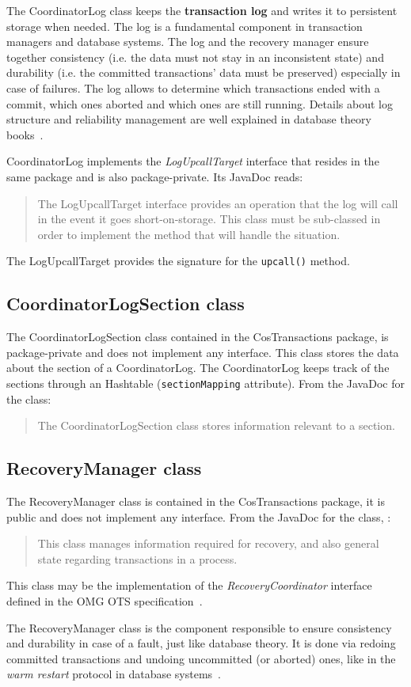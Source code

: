 The CoordinatorLog class keeps the \textbf{transaction log} and writes it to persistent storage when needed. The log is a fundamental component in transaction managers and database systems. The log and the recovery manager ensure together consistency (i.e. the data must not stay in an inconsistent state) and durability (i.e. the committed transactions' data must be preserved) especially in case of failures.
The log allows to determine which transactions ended with a commit, which ones aborted and which ones are still running.
Details about log structure and reliability management are well explained in database theory books~\cite{ceri-dbbook}.

CoordinatorLog implements the \emph{LogUpcallTarget} interface that resides in the same package and is also package-private. Its JavaDoc reads:
\begin{quote}
    The LogUpcallTarget interface provides an operation that the log will call in the event it goes short-on-storage. This class must be sub-classed in order to implement the method that will handle the situation.
\end{quote}
The LogUpcallTarget provides the signature for the \texttt{upcall()} method.

\subsection{CoordinatorLogSection class}
The CoordinatorLogSection class contained in the CosTransactions package, is package-private and does not implement any interface.
This class stores the data about the section of a CoordinatorLog.
The CoordinatorLog keeps track of the sections through an Hashtable (\texttt{sectionMapping} attribute).
From the JavaDoc for the class:
\begin{quote}
The CoordinatorLogSection class stores information relevant to a section.
\end{quote}

\subsection{RecoveryManager class}
The RecoveryManager class is contained in the CosTransactions package, it is public and does not implement any interface. From the JavaDoc for the class, :
\begin{quote}
    This class manages information required for recovery, and also general state regarding transactions in a process.
\end{quote}

This class may be the implementation of the \emph{RecoveryCoordinator} interface defined in the OMG OTS specification~\cite[p. 47]{omg-ots}.

The RecoveryManager class is the component responsible to ensure consistency and durability in case of a fault, just like database theory. 
It is done via redoing committed transactions and undoing uncommitted (or aborted) ones, like in the \emph{warm restart} protocol in database systems~\cite[p.~319]{ceri-dbbook}.
